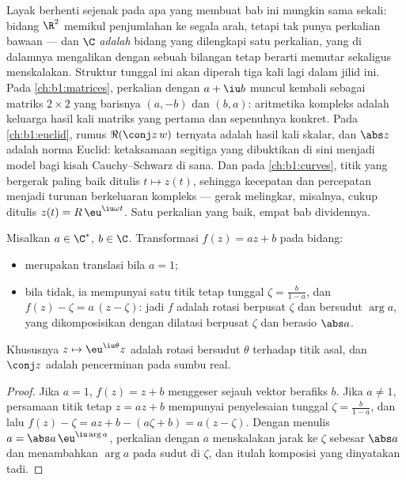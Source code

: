 \begin{remark}\label{rem:b1:complex:interlude}
Layak berhenti sejenak pada apa yang membuat bab ini mungkin sama sekali:
bidang $\R^2$ memikul penjumlahan ke segala arah, tetapi tak punya
perkalian bawaan --- dan $\C$ \emph{adalah} bidang yang
dilengkapi satu perkalian, yang di dalamnya mengalikan dengan sebuah bilangan
tetap berarti memutar sekaligus menskalakan. Struktur tunggal ini akan
diperah tiga kali lagi dalam jilid ini. Pada \cref{ch:b1:matrices}, perkalian dengan
$a + \iu b$ muncul kembali sebagai matriks $2 \times 2$ yang barisnya $(a,
-b)$ dan $(b, a)$: aritmetika kompleks adalah keluarga hasil kali matriks
yang pertama dan sepenuhnya konkret. Pada \cref{ch:b1:euclid},
rumus $\Re(\conj z\,w)$ ternyata adalah hasil kali skalar, dan
$\abs z$ adalah norma Euclid: ketaksamaan segitiga yang dibuktikan di sini
menjadi model bagi kisah Cauchy--Schwarz di sana. Dan pada
\cref{ch:b1:curves}, titik yang bergerak paling baik ditulis $t \mapsto
z(t)$, sehingga kecepatan dan percepatan menjadi turunan berkeluaran
kompleks --- gerak melingkar, misalnya, cukup ditulis $z(t) =
R\,\eu^{\iu\omega t}$. Satu perkalian yang baik, empat bab
dividennya.
\end{remark}

\begin{proposition}\label{prop:b1:complex:similitude}
Misalkan $a \in \C^*$, $b \in \C$. Transformasi $f(z) = az + b$ pada
bidang:
\begin{itemize}
  \item merupakan translasi bila $a = 1$;
  \item bila tidak, ia mempunyai satu titik tetap tunggal $\zeta = \frac{b}{1-a}$,
        dan $f(z) - \zeta = a\,(z - \zeta)$: jadi $f$ adalah rotasi
        berpusat $\zeta$ dan bersudut $\arg a$, yang dikomposisikan dengan
        dilatasi berpusat $\zeta$ dan berasio $\abs a$.
\end{itemize}
Khususnya $z \mapsto \eu^{\iu\theta} z$ adalah rotasi bersudut
$\theta$ terhadap titik asal, dan $\conj z$ adalah pencerminan pada sumbu
real.
\end{proposition}

\begin{proof}
Jika $a = 1$, $f(z) = z + b$ menggeser sejauh vektor berafiks $b$. Jika
$a \neq 1$, persamaan titik tetap $z = az + b$ mempunyai penyelesaian tunggal
$\zeta = \frac{b}{1-a}$, dan lalu $f(z) - \zeta = az + b -
(a\zeta + b) = a(z - \zeta)$. Dengan menulis $a = \abs a\, \eu^{\iu\arg a}$,
perkalian dengan $a$ menskalakan jarak ke $\zeta$ sebesar $\abs a$ dan menambahkan
$\arg a$ pada sudut di $\zeta$, dan itulah komposisi yang dinyatakan tadi.
\end{proof}

